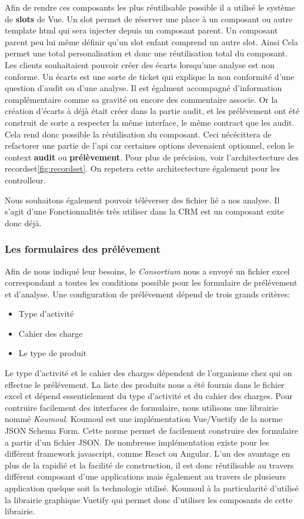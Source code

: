 Afin de rendre ces composants les plus réutilisable possible il a utilisé le système de \textbf{slots}\cite{vueslots} de Vue. Un slot permet de réserver une place à un composant ou autre template html qui sera injecter depuis un composant parent. Un composant parent peu lui même définir qu'un slot enfant comprend un autre slot. Ainsi Cela permet une total personalisation et donc une réutilisation total du composant. 
Les clients souhaitaient pouvoir créer des écarts lorsqu'une analyse est non conforme.
Un écarts est une sorte de ticket qui explique la non conformité d'une question d'audit ou d'une analyse. Il est égalment accompagné d'information complémentaire comme sa gravité ou encore des commentaire associe. Or la création d'écarts à déjà était créer dans la partie audit, et les prélévement ont été construit de sorte a respecter la même interface, le même contract que les audit. Cela rend donc possible la  réutilisation du composant. Ceci nécécittera de refactorer une partie de l'api car certaines options devenaient optionnel, celon le context \textbf{audit} ou \textbf{prélèvement}. Pour plus de précision, voir l'architectecture des recordset\ref{fig:recordset}. On repetera cette architectecture également pour les controlleur.

Nous souhaitons également pouvoir téléverser des fichier lié a nos analyse. Il s'agit d'une Fonctionnalités très utiliser dans la CRM est un composant exite donc déjà. 

\subsubsection{Les formulaires des prélévement}

Afin de nous indiqué leur besoins, le \textit{Consortium} nous a envoyé un fichier excel correspondant a toutes les conditions possible pour les formulaire de prélévement et d'analyse. 
Une configuration de prélévement dépend de trois grands critères: 
\begin{itemize}
    \item Type d'activité
    \item Cahier des charge
    \item Le type de produit
\end{itemize}
Le type d'activité et le cahier des charges dépendent de l'organisme chez qui on effectue le prélévement. La liste des produits nous a été fournis dans le fichier excel et dépend essentielement du type d'activité et du cahier des charges. Pour contruire facilement des interfaces de formulaire, nous utilisons une librairie nommé \textit{Koumoul}\cite{koumoul}. Koumoul est une implémentation Vue/Vuetify de la norme JSON Schema Form\cite{jsf}. Cette norme permet de facilement construire des formulaire a partir d'un fichier JSON. De nombreuse implémentation existe pour les différent framework javascript, comme React ou Angular. L'un des avantage en plus de la rapidié et la facilité de construction, il est donc réutilisable au travers différent composant d'une applications mais également au travers de plusieurs application quelque soit la technologie utilisé. Koumoul à la particularité d'utilisé la librairie graphique Vuetify qui permet donc d'utiliser les composants de cette librairie.

